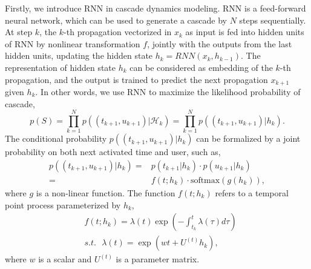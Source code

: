 Firstly, we introduce RNN in cascade dynamics modeling. RNN is a feed-forward
neural network, which can be used to generate a cascade by $N$ steps
sequentially.
At step $k$, the $k$-th propagation vectorized in $x_k$ as input is fed
into hidden units of RNN by nonlinear transformation $f$, jointly with the
outputs from the last hidden units, updating the hidden state
$h_k=\textit{RNN}(x_k,h_{k-1})$. The representation of hidden state $h_k$ can
be considered as embedding of the $k$-th propagation, and the output is trained
to predict the next propagation $x_{k+1}$ given $h_k$. In other words, we use
RNN to maximize the likelihood probability of cascade,
\begin{equation*}
p(S) = \prod_{k=1}^N p((t_{k+1}, u_{k+1})|\mathcal{H}_k) = \prod_{k=1}^N
p((t_{k+1}, u_{k+1})|h_k).
\end{equation*}
The conditional probability $p((t_{k+1}, u_{k+1})|h_k)$ can be
formalized by a joint probability on both next activated time and user, such as,
\begin{equation*}
\label{eq:cond_prob}
\begin{aligned}
p((t_{k+1}, u_{k+1})|h_k)=& p(t_{k+1}|h_{k}) \cdot
p(u_{k+1}|h_{k}) \\
= & f(t; h_{k}) \cdot \text{softmax}(g(h_k)),
\end{aligned}
\end{equation*}
where $g$ is a non-linear function.
The function $f(t;h_{k})$ refers to a temporal point process
parameterized by $h_{k}$,
\begin{equation*}
\begin{aligned}
& f(t; h_{k})=\lambda(t)\exp\left(-\int_{t_k}^t\lambda(\tau)d\tau\right) \\
&\textit{s.t.~~} \lambda(t) = \exp(wt+U^{(t)}h_k), 
\end{aligned}
\end{equation*}
where $w$ is a scalar and $U^{(t)}$ is a parameter matrix.
